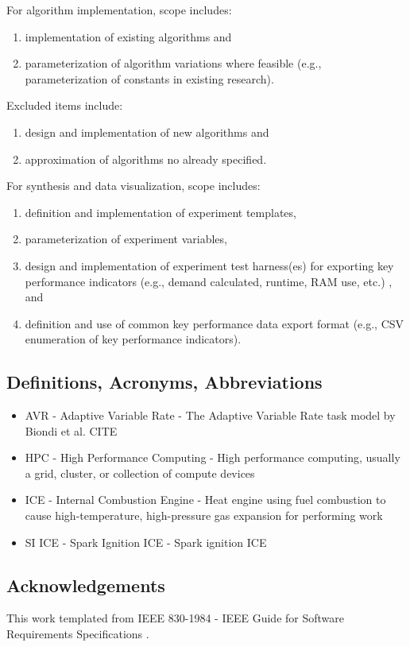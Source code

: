 For algorithm implementation, scope includes:
\begin{enumerate}
    \item implementation of existing algorithms and
    \item parameterization of algorithm variations where feasible
    (e.g., parameterization of constants in existing research).
\end{enumerate}

Excluded items include:
\begin{enumerate}
    \item design and implementation of new algorithms and
    \item approximation of algorithms no already specified.
\end{enumerate}

For synthesis and data visualization, scope includes:
\begin{enumerate}
    \item definition and implementation of experiment templates,
    \item parameterization of experiment variables,
    \item design and implementation of experiment test harness(es) for exporting
    key performance indicators (e.g., demand calculated, runtime, RAM use, etc.)
    , and
    \item definition and use of common key performance data export format (e.g.,
    CSV enumeration of key performance indicators).
\end{enumerate}
\subsection{Definitions, Acronyms, Abbreviations}

\begin{itemize}
    \item AVR - Adaptive Variable Rate - The Adaptive Variable Rate task model by
    Biondi et al. CITE
    \item HPC - High Performance Computing - High performance computing, usually a
    grid, cluster, or collection of compute devices
    \item ICE - Internal Combustion Engine - Heat engine using fuel combustion 
    to cause high-temperature, high-pressure gas expansion for performing work
    \item SI ICE - Spark Ignition ICE - Spark ignition ICE
\end{itemize}

\subsection{Acknowledgements}
This work templated from IEEE 830-1984 - IEEE Guide for Software Requirements
Specifications \cite{ieee_ieee_1984}.